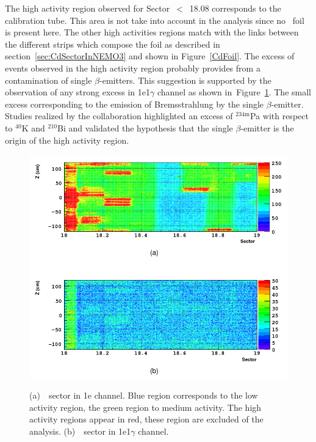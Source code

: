 \documentclass[main.tex]{subfiles}
\begin{document}
\NI The high activity region observed for Sector~$<$~18.08 corresponds to the calibration tube. This area is not take into account in the analysis since no \Cd~foil is present here. The other high activities regions match with the links between the different strips which compose the foil as described in section~\ref{sec:CdSectorInNEMO3} and shown in Figure~\ref{CdFoil}. The excess of events observed in the high activity region probably provides from a contamination of single $\beta$-emitters. This suggestion is supported by the observation of any strong excess in 1e1$\gamma$ channel as shown in~Figure~\ref{CdSector1eChannel}. The small excess corresponding to the emission of Bremsstrahlung by the single $\beta$-emitter. Studies realized by the collaboration highlighted an excess of $^{\text{234m}}$Pa with respect to $^{\text{40}}$K and $^{\text{210}}$Bi and validated the hypothesis that the single $\beta$-emitter is the origin of the high activity region.



\begin{figure}[h!]
\centering
\includegraphics[scale=0.40]{pictures/Chap6/CdSector-1e-1e1g.png}
\label{CdSector1eChannel}
\caption{(a)~\Cd~sector in 1e channel. Blue region corresponds to the low activity region, the green region to medium activity. The high activity regions appear in red, these region are excluded of the analysis. (b)~\Cd~sector in 1e1$\gamma$ channel.}
\end{figure}
\end{document}
